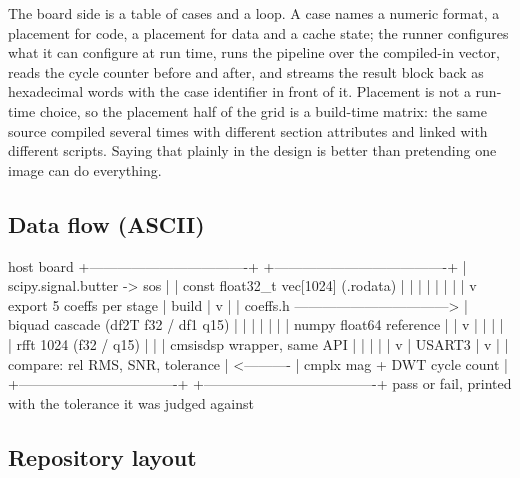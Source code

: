 The board side is a table of cases and a loop. A case names a numeric format,
a placement for code, a placement for data and a cache state; the runner
configures what it can configure at run time, runs the pipeline over the
compiled-in vector, reads the cycle counter before and after, and streams the
result block back as hexadecimal words with the case identifier in front of it.
Placement is not a run-time choice, so the placement half of the grid is a
build-time matrix: the same source compiled several times with different
section attributes and linked with different scripts. Saying that plainly in
the design is better than pretending one image can do everything.

\subsection*{Data flow (ASCII)}

\begin{asciiart}
  host                                             board
  +----------------------------------+             +-------------------------------------+
  | scipy.signal.butter -> sos       |             | const float32_t vec[1024]  (.rodata) |
  |   |                              |             |   |                                 |
  |   v  export 5 coeffs per stage   |  build      |   v                                 |
  | coeffs.h --------------------------------->    | biquad cascade (df2T f32 / df1 q15) |
  |                                  |             |   |                                 |
  | numpy float64 reference          |             |   v                                 |
  |   |                              |             | rfft 1024 (f32 / q15)               |
  |   |  cmsisdsp wrapper, same API  |             |   |                                 |
  |   v                              |  USART3     |   v                                 |
  | compare: rel RMS, SNR, tolerance | <---------- | cmplx mag + DWT cycle count         |
  +----------------------------------+             +-------------------------------------+
        pass or fail, printed with the tolerance it was judged against
\end{asciiart}

\subsection*{Repository layout}

